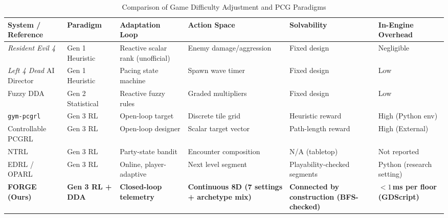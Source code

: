 \begin{table}[!htbp]
\centering
\caption{Comparison of Game Difficulty Adjustment and PCG Paradigms}
\label{tab:lit_comparison}
\scriptsize
\begin{tabular}{p{}p{}p{}p{}p{}p{}}
\toprule
\textbf{System / Reference} & \textbf{Paradigm} & \textbf{Adaptation Loop} & \textbf{Action Space} & \textbf{Solvability} & \textbf{In-Engine Overhead} \\
\midrule
\textit{Resident Evil 4}~\cite{engadget2015re4} & Gen 1 Heuristic & Reactive scalar rank (unofficial) & Enemy damage/aggression & Fixed design & Negligible \\
\textit{Left 4 Dead} AI Director~\cite{booth2009l4d} & Gen 1 Heuristic & Pacing state machine & Spawn wave timer & Fixed design & Low \\
Fuzzy DDA~\cite{chrysafiadi2023fuzzy} & Gen 2 Statistical & Reactive fuzzy rules & Graded multipliers & Fixed design & Low \\
\texttt{gym-pcgrl}~\cite{khalifa2020pcgrl} & Gen 3 RL & Open-loop target & Discrete tile grid & Heuristic reward & High (Python env) \\
Controllable PCGRL~\cite{earle2021controllable} & Gen 3 RL & Open-loop designer & Scalar target vector & Path-length reward & High (External) \\
NTRL~\cite{romeo2025ntrl} & Gen 3 RL & Party-state bandit & Encounter composition & N/A (tabletop) & Not reported \\
EDRL / OPARL~\cite{shu2021edrl, wang2022oparl} & Gen 3 RL & Online, player-adaptive & Next level segment & Playability-checked segments & Python (research setting) \\
\textbf{FORGE (Ours)} & \textbf{Gen 3 RL + DDA} & \textbf{Closed-loop telemetry} & \textbf{Continuous 8D (7 settings + archetype mix)} & \textbf{Connected by construction (BFS-checked)} & \textbf{$<1$\,ms per floor (GDScript)} \\
\bottomrule
\end{tabular}
\end{table}

